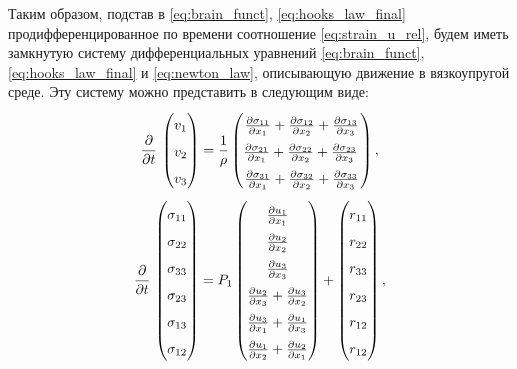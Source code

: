 \documentclass[a4paper, fontsize=14pt]{article}
\begin{document}
Таким образом, подстав в \eqref{eq:brain_funct}, \eqref{eq:hooks_law_final} продифференцированное по времени соотношение \eqref{eq:strain_u_rel}, будем иметь замкнутую систему дифференциальных уравнений \eqref{eq:brain_funct}, \eqref{eq:hooks_law_final} и \eqref{eq:newton_law}, описывающую движение в вязкоупругой среде.
Эту систему можно представить в следующим виде:
\begin{equation}
    \label{eq:system_on_v}
    \renewcommand\arraystretch{1.6}
    \frac{\partial }{\partial t}\, 
    \begin{pmatrix}
        v_1 \\
        v_2 \\
        v_3
    \end{pmatrix} =
    \frac{1}{\rho} 
    \begin{pmatrix} 
        \frac{\partial \sigma_{11}}{\partial x_1} +  \frac{\partial \sigma_{12}}{\partial x_2} + \frac{\partial \sigma_{13}}{\partial x_3} \\
        \frac{\partial \sigma_{21}}{\partial x_1} +  \frac{\partial \sigma_{22}}{\partial x_2} + \frac{\partial \sigma_{23}}{\partial x_3}\, \\
        \frac{\partial \sigma_{31}}{\partial x_1} +  \frac{\partial \sigma_{32}}{\partial x_2} + \frac{\partial \sigma_{33}}{\partial x_3}
    \end{pmatrix},
\end{equation}
\begin{equation}
    \label{eq:system_on_sigma}
    \renewcommand\arraystretch{1.6}
    \frac{\partial }{\partial t}\, 
    \begin{pmatrix}
        \sigma_{11} \\
        \sigma_{22} \\
        \sigma_{33} \\
        \sigma_{23} \\
        \sigma_{13} \\
        \sigma_{12}
    \end{pmatrix} = P_1
    \begin{pmatrix} 
    \frac{\partial u_1}{\partial x_1} \\
    \frac{\partial u_2}{\partial x_2} \\
    \frac{\partial u_3}{\partial x_3} \\
    \frac{\partial u_2}{\partial x_3} + \frac{\partial u_3}{\partial x_2} \\
    \frac{\partial u_3}{\partial x_1} + \frac{\partial u_1}{\partial x_3} \\
    \frac{\partial u_1}{\partial x_2} + \frac{\partial u_2}{\partial x_1}
    \end{pmatrix} +
    \begin{pmatrix} 
    r_{11} \\
    r_{22} \\
    r_{33} \\
    r_{23} \\
    r_{12} \\
    r_{12} 
    \end{pmatrix},
\end{equation}
\end{document}
